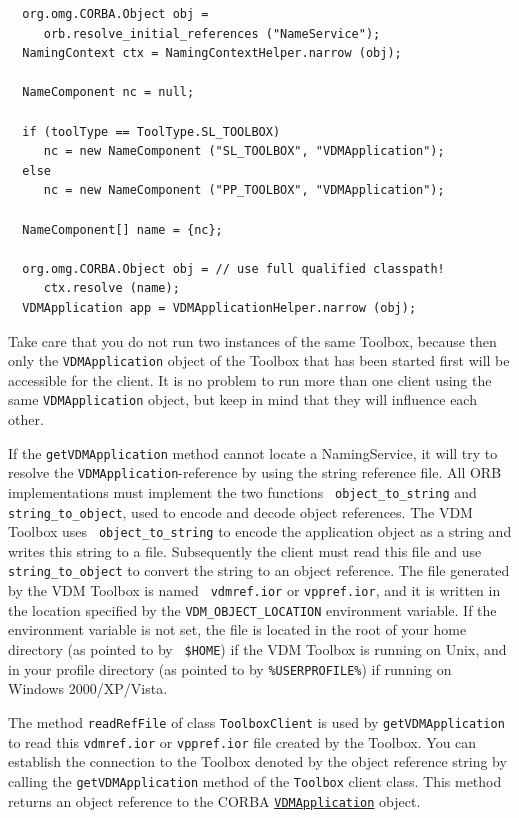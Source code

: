 \documentclass[\pformat,12pt]{article}
\newcommand{\VDMApplication}{\hyperlink{interface.VDMApplication}{VDMApplication}}
\begin{document}
\begin{verbatim}
  org.omg.CORBA.Object obj = 
     orb.resolve_initial_references ("NameService");
  NamingContext ctx = NamingContextHelper.narrow (obj);

  NameComponent nc = null;

  if (toolType == ToolType.SL_TOOLBOX)
     nc = new NameComponent ("SL_TOOLBOX", "VDMApplication");
  else
     nc = new NameComponent ("PP_TOOLBOX", "VDMApplication");

  NameComponent[] name = {nc};
  
  org.omg.CORBA.Object obj = // use full qualified classpath!
     ctx.resolve (name);
  VDMApplication app = VDMApplicationHelper.narrow (obj);
\end{verbatim}

Take care that you do not run two instances of the
same Toolbox, because then only the {\tt VDMApplication} object
of the Toolbox that has been started first will be accessible
for the client. It is no problem to run more than one client
using the same {\tt VDMApplication} object, but keep in mind
that they will influence each other.

If the {\tt getVDMApplication} method cannot locate a NamingService,
it will try to resolve the {\tt VDMApplication}-reference by using
the string reference file.
All ORB implementations must implement the two functions {\tt
  object\_to\_string} and {\tt string\_to\_object}, used to encode and
decode object references.  The VDM Toolbox uses {\tt
  object\_to\_string} to encode the application object as a string and
writes this string to a file.  Subsequently the client must read this
file and use {\tt string\_to\_object} to convert the string to an
object reference.  The file generated by the VDM Toolbox is named {\tt
  vdmref.ior} or {\tt vppref.ior}, and it is written in the location specified by the
{\tt VDM\_OBJECT\_LOCATION} environment variable.
If the environment variable is not set, the file is 
located in the root of your home directory (as pointed to by {\tt
  \$HOME}) if the VDM Toolbox is running on Unix, and in your profile
directory (as pointed to by {\tt \%USERPROFILE\%}) if running on Windows 2000/XP/Vista.

The method {\tt readRefFile} of class {\tt ToolboxClient} is used by 
{\tt getVDMApplication} to
read this \texttt{vdmref.ior} or \texttt{vppref.ior} file created by the Toolbox.
You can establish the connection to the Toolbox denoted by the
object reference string by calling the {\tt getVDMApplication} method
of the {\tt Toolbox} client class.  This method returns an object
reference to the CORBA {\tt \VDMApplication} object.
\end{document}
